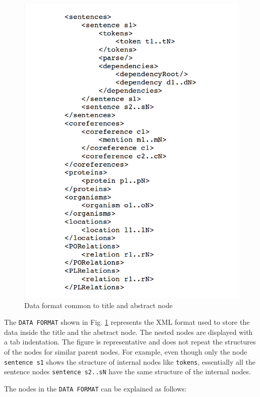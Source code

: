 \begin{enumerate}
\begin{figure}
\centering
\includegraphics[scale=0.4]{figures/XMLSchema2.png}
\caption{Data format common to title and abstract node}\label{fig:XMLSchema2}
\end{figure}

The \texttt{DATA FORMAT} shown in Fig. \ref{fig:XMLSchema2} represents the XML format used to store the data inside the title and the abstract node. The nested nodes are displayed with a tab indentation. The figure is representative and does not repeat the structures of the nodes for similar parent nodes. For example, even though only the node \texttt{sentence s1} shows the structure of internal nodes like \texttt{tokens}, essentially all the sentence nodes \texttt{sentence s2..sN} have the same structure of the internal nodes.

The nodes in the \texttt{DATA FORMAT} can be explained as follows:


\end{enumerate}
